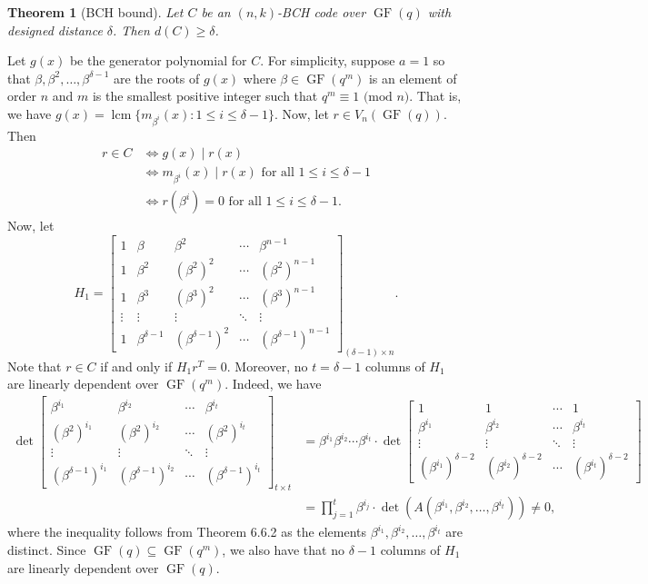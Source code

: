 \documentclass[10pt]{article}
\makeatletter
\DeclareMathOperator{\GF}{GF}
\DeclareMathOperator{\lcm}{lcm}
\theoremstyle{newstyle}
\newtheorem{thm}{Theorem}[subsection]
\newenvironment{pf}[1][\proofname]{\par
  \pushQED{\qed}%
  \normalfont \topsep0\p@\relax
  \trivlist
  \item[\hskip\labelsep\scshape
  #1\@addpunct{.}]\ignorespaces
}{%
  \popQED\endtrivlist\@endpefalse
}
\makeatother
\begin{document}
\begin{thm}[BCH bound]
Let $C$ be an $(n, k)$-BCH code over $\GF(q)$ with designed distance $\delta$. Then $d(C) \geq \delta$. 
\end{thm}
\begin{pf}
Let $g(x)$ be the generator polynomial for $C$. For simplicity, suppose $a = 1$ so that 
$\beta, \beta^2, \dots, \beta^{\delta-1}$ are the roots of $g(x)$ where 
$\beta \in \GF(q^m)$ is an element of order $n$ and $m$ is the smallest positive integer such that 
$q^m \equiv 1 \text{ (mod $n$)}$. That is, we have $g(x) = \lcm\{m_{\beta^i}(x) : 1 \leq i \leq \delta-1
\}$. Now, let $r \in V_n(\GF(q))$. Then 
\begin{align*}
    r \in C &\iff g(x) \mid r(x) \\
    &\iff m_{\beta^i}(x) \mid r(x) \text{ for all } 1 \leq i \leq \delta-1 \\
    &\iff r(\beta^i) = 0 \text{ for all } 1 \leq i \leq \delta-1. 
\end{align*}
Now, let 
\[ H_1 = \begin{bmatrix}
1 & \beta & \beta^2 & \cdots & \beta^{n-1} \\ 
1 & \beta^2 & (\beta^2)^2 & \cdots & (\beta^2)^{n-1} \\
1 & \beta^3 & (\beta^3)^2 & \cdots & (\beta^3)^{n-1} \\
\vdots & \vdots & \vdots & \ddots & \vdots \\
1 & \beta^{\delta-1} & (\beta^{\delta-1})^2 & \cdots & (\beta^{\delta-1})^{n-1} 
\end{bmatrix}_{(\delta-1)\times n}. \]
Note that $r \in C$ if and only if $H_1r^T = 0$. Moreover, no $t = \delta-1$ columns of $H_1$ are 
linearly dependent over $\GF(q^m)$. Indeed, we have 
\begin{align*} \det \begin{bmatrix}
\beta^{i_1} & \beta^{i_2} & \cdots & \beta^{i_t} \\
(\beta^2)^{i_1} & (\beta^2)^{i_2} & \cdots & (\beta^2)^{i_t} \\
\vdots & \vdots & \ddots & \vdots \\ 
(\beta^{\delta-1})^{i_1} & (\beta^{\delta-1})^{i_2} & \cdots & (\beta^{\delta-1})^{i_t}
\end{bmatrix}_{t\times t} 
&= \beta^{i_1}\beta^{i_2} \cdots \beta^{i_t} \cdot \det \begin{bmatrix}
1 & 1 & \cdots & 1 \\
\beta^{i_1} & \beta^{i_2} & \cdots & \beta^{i_t} \\
\vdots & \vdots & \ddots & \vdots \\
(\beta^{i_1})^{\delta-2} & (\beta^{i_2})^{\delta-2} & \cdots & (\beta^{i_t})^{\delta-2} 
\end{bmatrix} \\
&= \prod_{j=1}^t \beta^{i_j} \cdot \det(A(\beta^{i_1}, \beta^{i_2}, \dots, \beta^{i_t})) \neq 0,
\end{align*}
where the inequality follows from Theorem 6.6.2
as the elements $\beta^{i_1}, \beta^{i_2}, \dots, \beta^{i_t}$ are 
distinct. Since $\GF(q) \subseteq \GF(q^m)$, we also have that no $\delta-1$ columns of $H_1$ 
are linearly dependent over $\GF(q)$. 


\end{pf}
\end{document}
